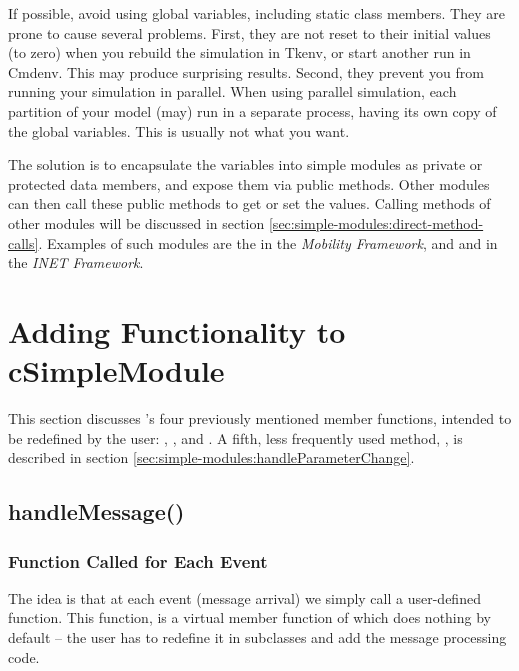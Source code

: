 If possible, avoid using global variables, including
static class members. They are prone to cause several problems.
First, they are not reset to their initial values (to zero)
when you rebuild the simulation in Tkenv, or start another run
in Cmdenv. This may produce surprising results.
Second, they prevent you from running your simulation in parallel.
When using parallel simulation, each partition of your model
(may) run in a separate process, having its own copy of the
global variables. This is usually not what you want.

The solution is to encapsulate the variables into simple modules
as private or protected data members, and expose them via public methods.
Other modules can then call these public methods to get or set the values.
Calling methods of other modules will be discussed in section
\ref{sec:simple-modules:direct-method-calls}.
Examples of such modules are the  in the \textit{Mobility Framework},
and  and  in the \textit{INET Framework}.



\section{Adding Functionality to cSimpleModule}
\label{sec:simple-modules:adding-functionality-to-csimplemodule}

This section discusses 's four previously
mentioned member functions, intended to be redefined by the user:
, , 
and . A fifth, less frequently used method,
, is described in section
\ref{sec:simple-modules:handleParameterChange}.



\subsection{handleMessage()}
\label{sec:simple-modules:handlemessage}

\subsubsection{Function Called for Each Event}


The idea is that at each event (message arrival) we
simply call a user-defined function. This function,
 is a
virtual member function of  which does
nothing by default -- the user has to redefine it in subclasses
and add the message processing code.

